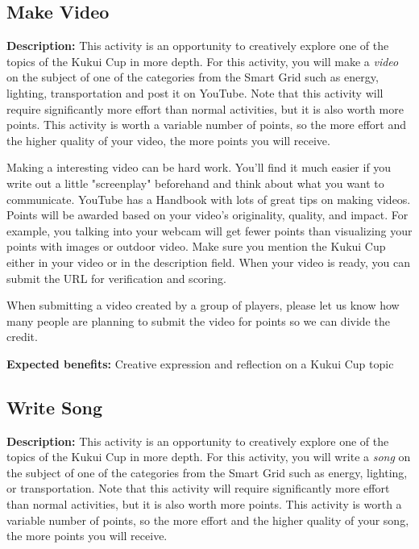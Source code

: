 \subsection{Make Video}

\textbf{Description:} This activity is an opportunity to creatively explore one of the topics of the Kukui Cup in more depth. For this activity, you will make a \emph{video} on the subject of one of the categories from the Smart Grid such as energy, lighting, transportation and post it on YouTube. Note that this activity will require significantly more effort than normal activities, but it is also worth more points. This activity is worth a variable number of points, so the more effort and the higher quality of your video, the more points you will receive.

Making a interesting video can be hard work. You'll find it much easier if you write out a little "screenplay" beforehand and think about what you want to communicate. YouTube has a Handbook with lots of great tips on making videos. Points will be awarded based on your video's originality, quality, and impact. For example, you talking into your webcam will get fewer points than visualizing your points with images or outdoor video. Make sure you mention the Kukui Cup either in your video or in the description field. When your video is ready, you can submit the URL for verification and scoring.

When submitting a video created by a group of players, please let us know how many people are planning to submit the video for points so we can divide the credit.

\vspace{2ex}
\textbf{Expected benefits:} Creative expression and reflection on a Kukui Cup topic


\subsection{Write Song}

\textbf{Description:} This activity is an opportunity to creatively explore one of the topics of the Kukui Cup in more depth. For this activity, you will write a \emph{song} on the subject of one of the categories from the Smart Grid such as energy, lighting, or transportation. Note that this activity will require significantly more effort than normal activities, but it is also worth more points. This activity is worth a variable number of points, so the more effort and the higher quality of your song, the more points you will receive.


